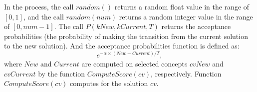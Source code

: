 In the process, the call $random()$ returns a random float value
in the range of $[0,1]$, and the call $random(num)$ returns a
random integer value in the range of $[0,num-1]$.
The call $P(kNew,kCurrent,T)$ returns the acceptance probabilities
(the probability of making the transition from the current
solution to the new solution).
And the acceptance probabilities function is defined as:
\[
e^{-\alpha \times (New-Current)/T},
\]
where $New$ and $Current$ are computed on selected
concepts $cvNew$ and $cvCurrent$ by the function $ComputeScore(cv)$, respectively.
Function $ComputeScore(cv)$ computes  for the solution $cv$.



